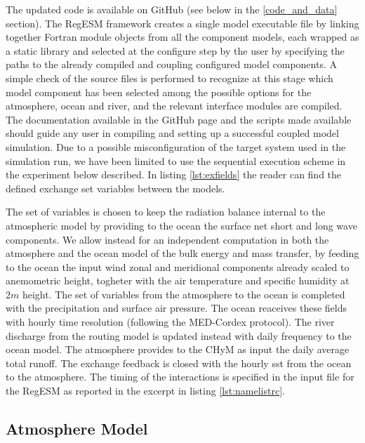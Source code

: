 \documentclass[journal abbreviation, manuscript]{copernicus}
\begin{document}
The updated code is available on GitHub (see below in the \ref{code_and_data}
section). The RegESM framework creates a single model executable file by
linking together Fortran module objects from all the component models, each
wrapped as a static library and selected at the configure step by the user
by specifying the paths to the already compiled and coupling configured
model components. A simple check of the source files is performed to recognize
at this stage which model component has been selected among the possible
options for the atmosphere, ocean and river, and the relevant interface
modules are compiled. The documentation available in the GitHub page and
the scripts made available should guide any user in compiling and setting
up a successful coupled model simulation. Due to a possible misconfiguration
of the target system used in the simulation run, we have been limited to use
the sequential execution scheme in the experiment below described.
In listing \ref{lst:exfields} the reader can find the defined exchange
set variables between the models.



The set of variables is chosen to keep the radiation balance internal to
the atmospheric model by providing to the ocean the surface net short and
long wave components.
We allow instead for an independent computation in both the atmosphere and
the ocean model of the bulk energy and mass transfer, by feeding to the ocean
the input wind zonal and meridional components already scaled to anemometric
height, togheter with the air temperature and specific humidity at $2m$ height.
The set of variables from the atmosphere to the ocean is completed with the
precipitation and surface air pressure.
The ocean reaceives these fields with hourly time resolution (following the
MED-Cordex protocol). The river discharge from the routing model is updated
instead with daily frequency to the ocean model. The atmosphere provides
to the CHyM as input the daily average total runoff. The exchange feedback
is closed with the hourly sst from the ocean to the atmosphere.
The timing of the interactions is specified in the input file for the RegESM
as reported in the excerpt in listing \ref{lst:namelistrc}.



\subsection{Atmosphere Model}
\end{document}
